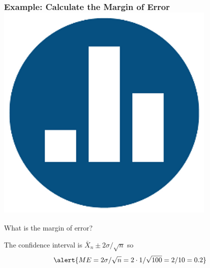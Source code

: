 \documentclass[handout]{beamer}
\begin{document}
\begin{frame}
\frametitle{Example: Calculate the Margin of Error \hfill \includegraphics[scale = 0.05]{./images/clicker}}
\begin{center}
\end{center}
What is the margin of error?
\pause

\vspace{2em}

The confidence interval is $\bar{X}_n \pm 2\sigma/\sqrt{n}$ so 
	$$\alert{ME = 2\sigma/\sqrt{n} = 2 \cdot 1/\sqrt{100} = 2/10 = 0.2}$$

\end{frame}
\end{document}
